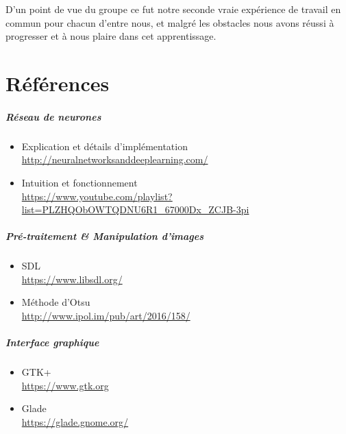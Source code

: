 D'un point de vue du groupe ce fut notre seconde vraie expérience de travail en
commun pour chacun d'entre nous, et malgré les obstacles nous avons réussi à
progresser et à nous plaire dans cet apprentissage.

\chapter{Références}

\paragraph{\bfseries{Réseau de neurones}}

\begin{itemize}
    \item Explication et détails d'implémentation \\
    \url{http://neuralnetworksanddeeplearning.com/}
    \item Intuition et fonctionnement \\
    \url{https://www.youtube.com/playlist?list=PLZHQObOWTQDNU6R1_67000Dx_ZCJB-3pi}
\end{itemize}

\paragraph{\bfseries{Pré-traitement \& Manipulation d'images}}

\begin{itemize}
    \item SDL \\ \url{https://www.libsdl.org/}
    \item Méthode d'Otsu \\ \url{http://www.ipol.im/pub/art/2016/158/}
\end{itemize}

\paragraph{\bfseries{Interface graphique}}

\begin{itemize}
    \item GTK+ \\ \url{https://www.gtk.org}
    \item Glade \\ \url{https://glade.gnome.org/}
\end{itemize}
